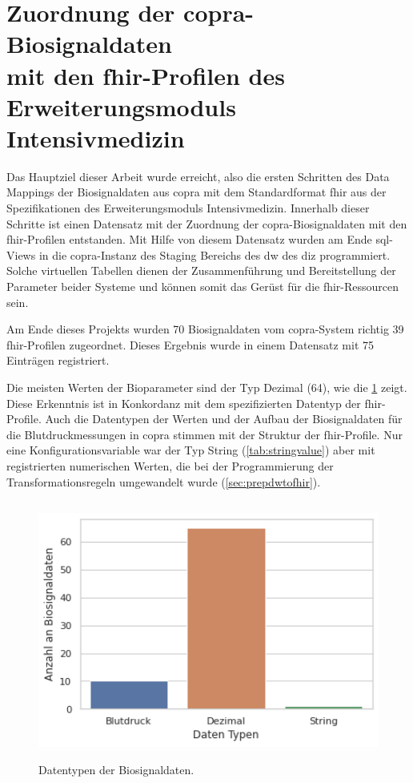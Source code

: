 \section[Zuordnung der \acs{copra}-Biosignaldaten mit den \acs{fhir}-Profilen des Erweiterungsmoduls \glqq Intensivmedizin\grqq{}]{Zuordnung der \acs{copra}-Biosignaldaten \\ mit den \acs{fhir}-Profilen des Erweiterungsmoduls \glqq Intensivmedizin\grqq{}} \label{sect:resdatamapping}

Das Hauptziel dieser Arbeit wurde erreicht, also die ersten Schritten des Data Mappings der Biosignaldaten aus \ac{copra} mit dem Standardformat \ac{fhir} aus der Spezifikationen des Erweiterungsmoduls \glqq Intensivmedizin\grqq{}. Innerhalb dieser Schritte ist einen Datensatz mit der Zuordnung der \ac{copra}-Biosignaldaten mit den \ac{fhir}-Profilen entstanden. Mit Hilfe von diesem Datensatz wurden am Ende \ac{sql}-Views in die \ac{copra}-Instanz des Staging Bereichs des \ac{dw} des \ac{diz} programmiert. Solche virtuellen Tabellen dienen der Zusammenführung und Bereitstellung der Parameter beider Systeme und können somit das Gerüst für die \ac{fhir}-Ressourcen sein.

Am Ende dieses Projekts wurden 70 Biosignaldaten vom \ac{copra}-System richtig 39 \ac{fhir}-Profilen zugeordnet. Dieses Ergebnis wurde in einem Datensatz mit 75 Einträgen registriert.

Die meisten Werten der Bioparameter sind der Typ Dezimal (64), wie die \ref{fig:signaldatatyps} zeigt. Diese Erkenntnis ist in Konkordanz mit dem spezifizierten Datentyp der \ac{fhir}-Profile. Auch die Datentypen der Werten und der Aufbau der Biosignaldaten für die Blutdruckmessungen in \ac{copra} stimmen mit der Struktur der \ac{fhir}-Profile. Nur eine Konfigurationsvariable war der Typ String (\ref{tab:stringvalue}) aber mit registrierten numerischen Werten, die bei der Programmierung der Transformationsregeln umgewandelt wurde (\ref{sec:prepdwtofhir}).

\begin{figure}[ht]
	\centering
	\includegraphics[height=8.5cm]{figures/biosignal_data_types}
	\caption[Datentypen der Biosignaldaten]{Datentypen der Biosignaldaten.}
	\label{fig:signaldatatyps}
\end{figure}

